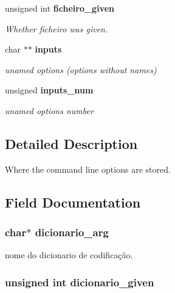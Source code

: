 \begin{DoxyCompactItemize}
unsigned int {\bf ficheiro\_\-given}
\begin{DoxyCompactList}\small\item\em Whether ficheiro was given. \end{DoxyCompactList}\item 
char $\ast$$\ast$ {\bf inputs}
\begin{DoxyCompactList}\small\item\em unamed options (options without names) \end{DoxyCompactList}\item 
unsigned {\bf inputs\_\-num}
\begin{DoxyCompactList}\small\item\em unamed options number \end{DoxyCompactList}\end{DoxyCompactItemize}


\subsection{Detailed Description}
Where the command line options are stored. 

\subsection{Field Documentation}
\subsubsection[{dicionario\_\-arg}]{\setlength{\rightskip}{0pt plus 5cm}char$\ast$ {\bf dicionario\_\-arg}}\label{da/dad/structgengetopt__args__info_a80d3efd5eba976ddde25dda07196cc02}


nome do dicionario de codificação. 

\subsubsection[{dicionario\_\-given}]{\setlength{\rightskip}{0pt plus 5cm}unsigned int {\bf dicionario\_\-given}}\label{da/dad/structgengetopt__args__info_a5dd415eb70a3ab856e20b3d37035ef8c}


